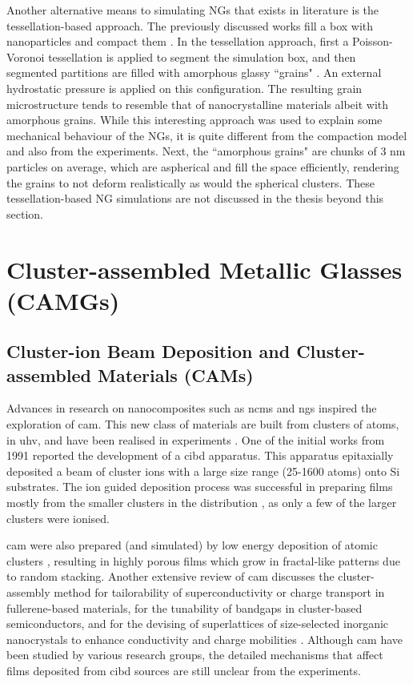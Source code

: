 Another alternative means to simulating NGs that exists in literature is the tessellation-based approach. The previously discussed works fill a box with nanoparticles and compact them \cite{Sopu2009,Adjaoud2018,Adjaoud2019,Cheng2019,Cheng2019a}. In the tessellation approach, first a Poisson-Voronoi tessellation is applied to segment the simulation box, and then segmented partitions are filled with amorphous glassy ``grains" \cite{Adibi2014,Sha2017,Ma2020,Zheng2021}. An external hydrostatic pressure is applied on this configuration. The resulting grain microstructure tends to resemble that of nanocrystalline materials albeit with amorphous grains. While this interesting approach was used to explain some mechanical behaviour of the NGs, it is quite different from the compaction model and also from the experiments. Next, the ``amorphous grains" are chunks of 3 nm particles on average, which are aspherical and  fill the space efficiently, rendering the grains to not deform realistically as would the spherical clusters. These tessellation-based NG simulations are not discussed in the thesis beyond this section. \par

\section{Cluster-assembled Metallic Glasses (CAMGs)} \label{s:camgs}

\subsection{Cluster-ion Beam Deposition and Cluster-assembled Materials (CAMs)}
Advances in research on nanocomposites such as \gls{ncm}s and \gls{ng}s inspired the exploration of \gls{cam}. This new class of materials are built from clusters of atoms, in \gls{uhv}, and have been realised in experiments \cite{Takagi1986,Takagi1988,Beuhler1986}. One of the initial works from 1991 reported the development of a \gls{cibd} apparatus. This apparatus epitaxially deposited a beam of cluster ions with a large size range (25-1600 atoms) onto Si substrates. The ion guided deposition process was successful in preparing films mostly from the smaller clusters in the distribution \cite{Brown1991}, as only a few of the larger clusters were ionised. \par

\gls{cam} were also prepared (and simulated) by low energy deposition of atomic clusters \cite{Perez1997}, resulting in highly porous films which grow in fractal-like patterns due to random stacking. Another extensive review of \gls{cam} discusses the cluster-assembly method for tailorability of superconductivity or charge transport in fullerene-based materials, for the tunability of bandgaps in cluster-based semiconductors, and for the devising of superlattices of size-selected inorganic nanocrystals to enhance conductivity and charge mobilities \cite{Claridge2009}. Although \gls{cam} have been studied by various research groups, the detailed mechanisms that affect films deposited from \gls{cibd} sources are still unclear from the experiments. \par

